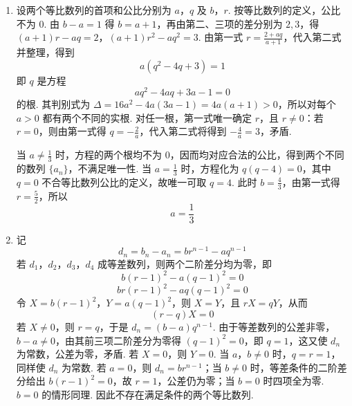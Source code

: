 \begin{solution}
\begin{enumerate}
\item 设两个等比数列的首项和公比分别为 \(a\)，\(q\) 及 \(b\)，\(r\). 按等比数列的定义，公比不为 \(0\). 由 \(b-a=1\) 得 \(b=a+1\)，再由第二、三项的差分别为 \(2,3\)，得
\((a+1)r-aq=2\)，\((a+1)r^2-aq^2=3\).
由第一式 \(r=\frac{2+aq}{a+1}\)，代入第二式并整理，得到
\[
a(q^2-4q+3)=1
\]
即 \(q\) 是方程
\[
a q^2-4a q+3a-1=0
\]
的根. 其判别式为 \(\Delta=16a^2-4a(3a-1)=4a(a+1)>0\)，所以对每个 \(a>0\) 都有两个不同的实根. 对任一根，第一式唯一确定 \(r\)，且 \(r\ne0\)：若 \(r=0\)，则由第一式得 \(q=-\frac2a\)，代入第二式将得到 \(-\frac4a=3\)，矛盾.

当 \(a\ne\frac13\) 时，方程的两个根均不为 \(0\)，因而均对应合法的公比，得到两个不同的数列 \(\{a_n\}\)，不满足唯一性. 当 \(a=\frac13\) 时，方程化为 \(q(q-4)=0\)，其中 \(q=0\) 不合等比数列公比的定义，故唯一可取 \(q=4\). 此时 \(b=\frac43\)，由第一式得 \(r=\frac52\)，所以
\[
a=\frac13
\]
\item 记
\[
d_n=b_n-a_n=br^{n-1}-aq^{n-1}
\]
若 \(d_1\)，\(d_2\)，\(d_3\)，\(d_4\) 成等差数列，则两个二阶差分均为零，即
\[
b(r-1)^2-a(q-1)^2=0
\]
\[
br(r-1)^2-aq(q-1)^2=0
\]
令 \(X=b(r-1)^2\)，\(Y=a(q-1)^2\)，则 \(X=Y\)，且 \(rX=qY\)，从而
\[
(r-q)X=0
\]
若 \(X\ne0\)，则 \(r=q\)，于是 \(d_n=(b-a)q^{n-1}\). 由于等差数列的公差非零，\(b-a\ne0\)，由其前三项二阶差分为零得 \((q-1)^2=0\)，即 \(q=1\)，这又使 \(d_n\) 为常数，公差为零，矛盾.
若 \(X=0\)，则 \(Y=0\). 当 \(a\)，\(b\ne0\) 时，\(q=r=1\)，同样使 \(d_n\) 为常数. 若 \(a=0\)，则 \(d_n=br^{n-1}\)；当 \(b\ne0\) 时，等差条件的二阶差分给出 \(b(r-1)^2=0\)，故 \(r=1\)，公差仍为零；当 \(b=0\) 时四项全为零. \(b=0\) 的情形同理. 因此不存在满足条件的两个等比数列.
\end{enumerate}
\end{solution}
